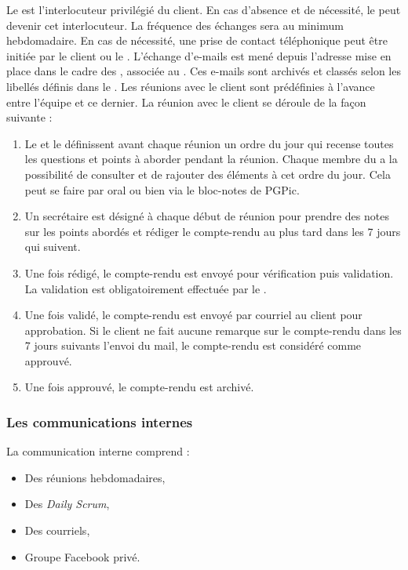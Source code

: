 Le \CP{} est l’interlocuteur privilégié du client. En cas d’absence et de nécessité, le \CPA{} peut devenir cet interlocuteur. La fréquence des échanges sera au minimum hebdomadaire. En cas de nécessité, une prise de contact téléphonique peut être initiée par
le client ou le \CP. L’échange d’e-mails est mené depuis l’adresse mise en place dans le cadre des \PICCourt, associée au \CP. Ces e-mails sont archivés et classés selon les libellés définis dans le \PGC. Les réunions avec le client sont prédéfinies à l’avance entre l’équipe \PICCourt et ce dernier. La réunion avec le client se déroule de la façon suivante :
\begin{enumerate}
\item Le \CP{} et le \CPA{} définissent avant chaque réunion un ordre du jour qui recense toutes les questions et points à aborder pendant la réunion. Chaque membre du \PICCourt a la possibilité de consulter et de rajouter des éléments à cet ordre du jour. Cela peut se faire par oral ou bien via le bloc-notes de PGPic.
\item Un secrétaire est désigné à chaque début de réunion pour prendre des notes sur les points abordés et rédiger le compte-rendu au plus tard dans les 7 jours qui suivent.
\item Une fois rédigé, le compte-rendu est envoyé pour vérification puis validation. La validation est obligatoirement effectuée par le \CP.
\item Une fois validé, le compte-rendu est envoyé par courriel au client pour approbation. Si le client ne fait aucune remarque sur le compte-rendu dans les 7 jours suivants l’envoi du mail, le compte-rendu est considéré comme approuvé.
\item Une fois approuvé, le compte-rendu est archivé.
\end{enumerate}


\subsubsection*{Les communications internes}

La communication interne comprend :
\begin{itemize}
\item Des réunions hebdomadaires,
\item Des \textit{Daily Scrum},
\item Des courriels,
\item Groupe Facebook privé. \\
\end{itemize}

